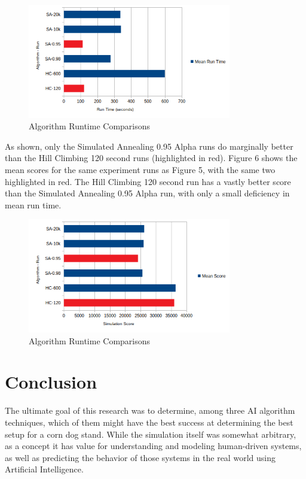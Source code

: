 \documentclass[10pt, twocolumn]{article}
\begin{document}
\medskip
\begin{figure}[!ht]
\centering
\includegraphics[width=3.5in]{runtime_compare.png}
\caption{Algorithm Runtime Comparisons}
\label{fig_5}
\end{figure}
\medskip

As shown, only the Simulated Annealing 0.95 Alpha runs do marginally better than the Hill Climbing 120 second
runs (highlighted in red). Figure 6 shows the mean scores for the same experiment runs
as Figure 5, with the same two highlighted in red. The Hill Climbing 120 second run has
a vastly better score than the Simulated Annealing 0.95 Alpha run, with only a
small deficiency in mean run time.

\medskip
\begin{figure}[!ht]
\centering
\includegraphics[width=3.5in]{score_compare.png}
\caption{Algorithm Runtime Comparisons}
\label{fig_6}
\end{figure}
\medskip

\section{Conclusion}

The ultimate goal of this research was to determine, among three AI algorithm
techniques, which of them might have the best success at determining the best setup
for a corn dog stand. While the simulation itself was somewhat arbitrary, as a concept
it has value for understanding and modeling human-driven systems, as well as predicting
the behavior of those systems in the real world using Artificial Intelligence.
\end{document}
